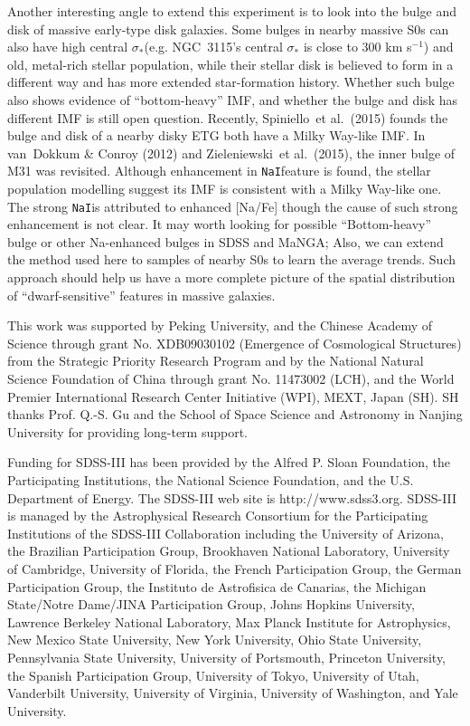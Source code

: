 \documentclass[preprint]{aastex}
\def\etal{{\ et al.~}}
\def\kms{km s$^{-1}$}
\def\sigstar{$\sigma_{\ast}$}
\def\nai{{\tt NaI}}
\begin{document}
\begin{CJK*}{UTF8}{gbsn}
  Another interesting angle to extend this experiment is to look into the bulge 
  and disk of massive early-type disk galaxies.  Some bulges in nearby 
  massive S0s can also have high central \sigstar (e.g. NGC~3115's central \sigstar 
  is close to 300 \kms) and old, metal-rich stellar population, while their 
  stellar disk is believed to form in a different way and has more extended 
  star-formation history.  Whether such bulge also shows evidence of ``bottom-heavy'' 
  IMF, and whether the bulge and disk has different IMF is still open question.  
  Recently, Spiniello\etal (2015) founds the bulge and disk of a nearby disky 
  ETG both have a Milky Way-like IMF.  In van~Dokkum \& Conroy (2012) and 
  Zieleniewski\etal (2015), the inner bulge of M31 was revisited.  Although 
  enhancement in \nai feature is found, the stellar population modelling suggest
  its IMF is consistent with a Milky Way-like one.  The strong \nai is attributed 
  to enhanced [Na/Fe] though the cause of such strong enhancement is not clear. 
  It may worth looking for possible ``Bottom-heavy'' bulge or other Na-enhanced 
  bulges in SDSS and MaNGA; Also, we can extend the method used here to samples 
  of nearby S0s to learn the average trends.  Such approach should help us have 
  a more complete picture of the spatial distribution of ``dwarf-sensitive'' 
  features in massive galaxies.  

  
\acknowledgements 
   
  This work was supported by Peking University, and the Chinese 
  Academy of Science through grant No. XDB09030102 (Emergence of Cosmological 
  Structures) from the Strategic Priority Research Program and by the National 
  Natural Science Foundation of China through grant No. 11473002 (LCH), and the 
  World Premier International Research Center Initiative (WPI), MEXT, Japan 
  (SH). SH thanks Prof. Q.-S. Gu and the School of Space Science and Astronomy 
  in Nanjing University for providing long-term support.  
  
  Funding for SDSS-III has been provided by the Alfred P. Sloan Foundation, the
  Participating Institutions, the National Science Foundation, and the U.S.
  Department of Energy. The SDSS-III web site is http://www.sdss3.org.  SDSS-III
  is managed by the Astrophysical Research Consortium for the Participating
  Institutions of the SDSS-III Collaboration including the University of
  Arizona, the Brazilian Participation Group, Brookhaven National Laboratory,
  University of Cambridge, University of Florida, the French Participation
  Group, the German Participation Group, the Instituto de Astrofisica de
  Canarias, the Michigan State/Notre Dame/JINA Participation Group, Johns
  Hopkins University, Lawrence Berkeley National Laboratory, Max Planck
  Institute for Astrophysics, New Mexico State University, New York University,
  Ohio State University, Pennsylvania State University, University of
  Portsmouth, Princeton University, the Spanish Participation Group, University
  of Tokyo, University of Utah, Vanderbilt University, University of Virginia,
  University of Washington, and Yale University.


\end{CJK*}
\end{document}
